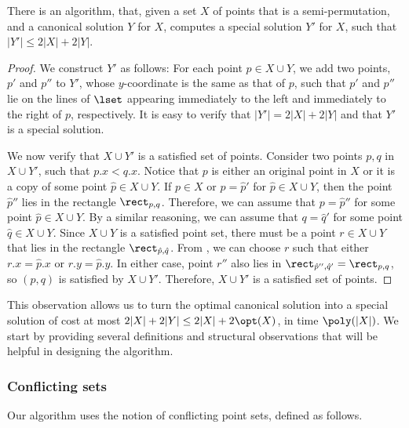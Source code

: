 \begin{myobs}
        \label{obs: canonical to special} 
        There is an algorithm, that, given a set $X$ of points that is a semi-permutation, and a canonical solution $Y$ for $X$, computes a special solution $Y'$ for $X$, such that $|Y'| \leq 2 |X| + 2 |Y|$. 
\end{myobs}
\begin{proof}
We construct $Y'$ as follows: For each point $p \in X \cup Y$, we add two points, $p'$ and $p''$ to $Y'$, whose $y$-coordinate is the same as that of $p$, such that $p'$ and $p''$ lie on the lines of $\lset$ appearing immediately to the left and immediately to the right of $p$, respectively. %
                It is easy to verify that $|Y'|=2|X|+2|Y|$ and that $Y'$ is a special solution. 
        
        We now verify that $X \cup Y'$ is a satisfied set of points. 
        Consider two points $p,q$ in $X \cup Y'$, such that $p.x < q.x$. Notice that $p$ is either an original point in $X$ or it is a copy of some point $\hat p\in X \cup Y$. 
        If $p \in X$ or $p = \hat p'$ for $\hat p \in X \cup Y$, then the point $\hat p''$ lies in the rectangle $\rect_{p,q}$. Therefore, we can assume that $p=\hat p''$ for some point $\hat p\in X\cup Y$.
        By a similar reasoning, we can assume that $q=\hat q'$ for some point $\hat q\in X\cup Y$. Since $X\cup Y$ is a satisfied point set, there must be a point $r\in X\cup Y$ that lies in the rectangle $\rect_{\hat p,\hat q}$. From , we can choose $r$ such that either $r.x=\hat p.x$ or $r.y=\hat p.y$. In either case, point $r''$ also lies in $\rect_{\hat p'',\hat q'}=\rect_{p,q}$, so $(p,q)$ is satisfied by $X\cup Y'$. %
        Therefore, $X\cup Y'$ is a satisfied set of points. 
\end{proof}



This observation allows us to turn the optimal canonical solution into a special solution of cost at most $2|X|+2|Y|\leq 2|X|+2\opt(X)$, in time $\poly(|X|)$. 
We start by providing several definitions and structural observations that will be helpful in designing the algorithm.

\subsubsection{Conflicting sets} 

Our algorithm uses the notion of conflicting point sets, defined as follows.

